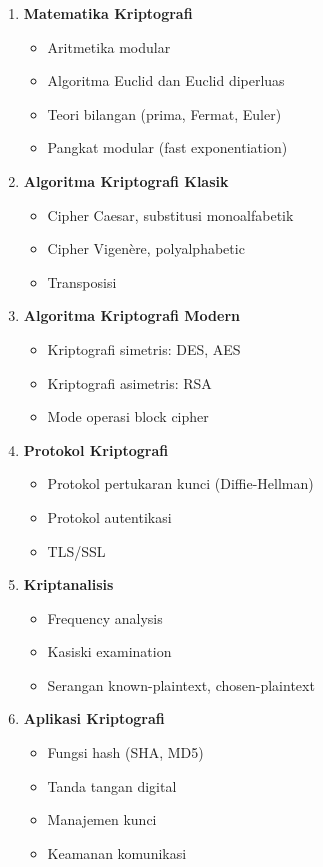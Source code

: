 \documentclass[12pt,a4paper]{article}
\begin{document}
\begin{enumerate}
\item \textbf{Matematika Kriptografi}
\begin{itemize}
\item Aritmetika modular
\item Algoritma Euclid dan Euclid diperluas
\item Teori bilangan (prima, Fermat, Euler)
\item Pangkat modular (fast exponentiation)
\end{itemize}

\item \textbf{Algoritma Kriptografi Klasik}
\begin{itemize}
\item Cipher Caesar, substitusi monoalfabetik
\item Cipher Vigenère, polyalphabetic
\item Transposisi
\end{itemize}

\item \textbf{Algoritma Kriptografi Modern}
\begin{itemize}
\item Kriptografi simetris: DES, AES
\item Kriptografi asimetris: RSA
\item Mode operasi block cipher
\end{itemize}

\item \textbf{Protokol Kriptografi}
\begin{itemize}
\item Protokol pertukaran kunci (Diffie-Hellman)
\item Protokol autentikasi
\item TLS/SSL
\end{itemize}

\item \textbf{Kriptanalisis}
\begin{itemize}
\item Frequency analysis
\item Kasiski examination
\item Serangan known-plaintext, chosen-plaintext
\end{itemize}

\item \textbf{Aplikasi Kriptografi}
\begin{itemize}
\item Fungsi hash (SHA, MD5)
\item Tanda tangan digital
\item Manajemen kunci
\item Keamanan komunikasi
\end{itemize}
\end{enumerate}
\end{document}
